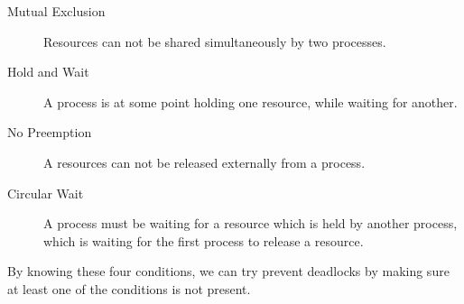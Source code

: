 \begin{description}
\item[Mutual Exclusion] Resources can not be shared simultaneously by two processes.
\item[Hold and Wait] A process is at some point holding one resource, while waiting for another.
\item[No Preemption] A resources can not be released externally from a process.
\item[Circular Wait] A process must be waiting for a resource which is held by another process, which is waiting for the first process to release a resource.
\end{description}

By knowing these four conditions, we can try prevent deadlocks by making sure at least one of the conditions is not present.
